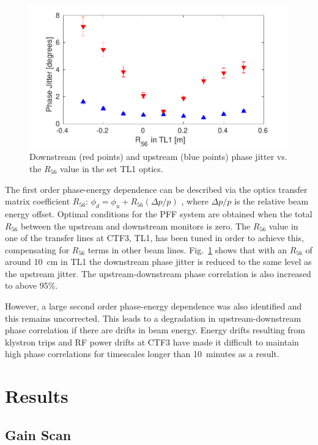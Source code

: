 \documentclass[%
 reprint,
superscriptaddress,
 amsmath,amssymb,
 prl,
]{revtex4-1}
\begin{document}
\begin{figure}
	\includegraphics[width=\columnwidth]{figs/r56Scan}%
	\caption{\label{fig:r56Scan}Downstream (red points) and upstream (blue 
		points) phase jitter vs. the \(R_{56}\) value in the set TL1 optics. 
		}
\end{figure}

The first order phase-energy dependence can be described via the optics 
transfer matrix coefficient \(R_{56}\):
\(\phi_d = \phi_u + R_{56}(\Delta p / p)\)
, where \(\Delta p / p\) is the relative beam energy offset.
Optimal conditions for the PFF system are obtained when the total \(R_{56}\) 
between the upstream and downstream monitors is zero.
The \(R_{56}\) value in one of the transfer lines at CTF3, TL1, has been tuned 
in order to achieve this, compensating for \(R_{56}\) terms in other beam lines.
Fig.~\ref{fig:r56Scan} shows that with an \(R_{56}\) of around 10~cm in TL1 the 
downstream phase jitter is reduced to the same level as the upstream jitter. 
The upstream-downstream phase correlation is also increased to above 95\%.

However, a large second order phase-energy dependence was also identified and 
this remains uncorrected. This leads to a degradation in upstream-downstream 
phase correlation if there are drifts in beam energy. Energy drifts resulting 
from klystron trips and RF power drifts at CTF3 have made it difficult to 
maintain high phase correlations for timescales longer than 10~minutes as a 
result.

\section{\label{s:results}Results}

\subsection{\label{ss:gScan}Gain Scan}
\end{document}
